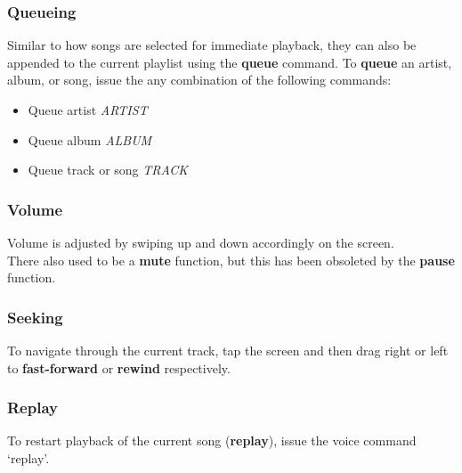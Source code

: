 \documentclass[12pt,letterpaper]{article}
\begin{document}
\subsubsection*{Queueing}
Similar to how songs are selected for immediate playback, they can also be appended to the current playlist using the \textbf{queue} command. To \textbf{queue} an artist, album, or song, issue the any combination of the following commands:
	\begin{itemize}
	\item Queue artist \textit{ARTIST}
	\item Queue album \textit{ALBUM}
	\item Queue track or song \textit{TRACK}
	\end{itemize}
\subsubsection*{Volume}
Volume is adjusted by swiping up and down accordingly on the screen. \\
{\color{green} There also used to be a \textbf{mute} function, but this has been obsoleted by the \textbf{pause} function.}
\subsubsection*{Seeking}
To navigate through the current track, tap the screen and then drag right or left to \textbf{fast-forward} or \textbf{rewind} respectively.
\subsubsection*{Replay}
To restart playback of the current song (\textbf{replay}), issue the voice command `replay'.
\end{document}
